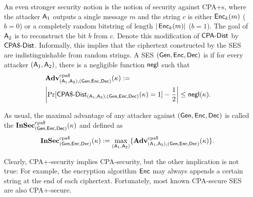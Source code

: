 An even stronger security notion is the notion of security against \acfp{CPA+}, where the
attacker $\operatorname{\mathsf{A}}_{1}$ outputs a single message $m$ and the string $c$ is either
$\operatorname{\mathsf{Enc}}_{k}(m)$ ($b=0$) or a completely random bitstring of length
$|\operatorname{\mathsf{Enc}}_{k}(m)|$ ($b=1$). The goal of $\operatorname{\mathsf{A}}_{2}$ is to reconstruct the
bit $b$ from $c$. Denote this modification of $\CPA-Dist$ by
$\CPAD-Dist$.  Informally, this implies that the ciphertext
constructed by the \ac{SES} are indistinguishable from random strings. 
A \acl{SES} $(\operatorname{\mathsf{Gen}},\operatorname{\mathsf{Enc}},\operatorname{\mathsf{Dec}})$ is  if for every
attacker $(\operatorname{\mathsf{A}}_{1},\operatorname{\mathsf{A}}_{2})$, there is a negligible function $\operatorname{\mathsf{negl}}$
such that 
\begin{align*}
  &\Adv_{(\Att_{1},\Att_{2}),(\Gen,\Enc,\Dec)}^{\cpad}(\kappa) :=\\
  &\left|\Pr[\CPAD-Dist_{(\Att_{1},\Att_{2}),(\Gen,\Enc,\Dec)}(\kappa)=1]-\frac{1}{2}\right|\leq
    \negl(\kappa).
\end{align*}

As usual, the maximal advantage of any attacker against
$(\operatorname{\mathsf{Gen}},\operatorname{\mathsf{Enc}},\operatorname{\mathsf{Dec}})$ is called the 
$\InSec_{(\Gen,\Enc,\Dec)}^{\cpad}(\kappa)$ and defined as
\begin{align*}
  \InSec_{(\Gen,\Enc,\Dec)}^{\cpad}(\kappa) := \max_{(\Att_{1},\Att_{2})}\{\Adv^{\cpad}_{(\Att_{1},\Att_{2}),(\Gen,\Enc,\Dec)}(\kappa)\}.
\end{align*}

Clearly, \acs{CPA+}-security implies \acs{CPA}-security, but the other
implication is not true: For example, the encryption algorithm $\operatorname{\mathsf{Enc}}$
may always appends a certain string at the end of each
ciphertext. Fortunately, most known \ac{CPA}-secure \ac{SES} are also
\ac{CPA+}-secure. 

